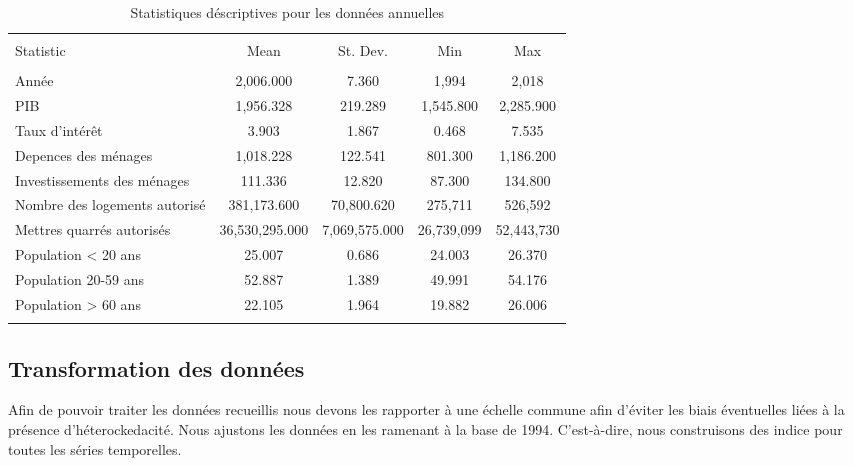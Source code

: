 \documentclass[11pt,]{article}
\begin{document}
\FloatBarrier

\begin{table}[!htbp] \centering 
\begin{tabular}{@{\extracolsep{5pt}}lcccc} 
\\[-1.8ex]\hline 
\hline \\[-1.8ex] 
Statistic & \multicolumn{1}{c}{Mean} & \multicolumn{1}{c}{St. Dev.} & \multicolumn{1}{c}{Min} & \multicolumn{1}{c}{Max} \\ 
\hline \\[-1.8ex] 
Année & 2,006.000 & 7.360 & 1,994 & 2,018 \\ 
PIB & 1,956.328 & 219.289 & 1,545.800 & 2,285.900 \\ 
Taux d'intérêt & 3.903 & 1.867 & 0.468 & 7.535 \\ 
Depences des ménages & 1,018.228 & 122.541 & 801.300 & 1,186.200 \\ 
Investissements des ménages & 111.336 & 12.820 & 87.300 & 134.800 \\ 
Nombre des logements autorisé & 381,173.600 & 70,800.620 & 275,711 & 526,592 \\ 
Mettres quarrés autorisés & 36,530,295.000 & 7,069,575.000 & 26,739,099 & 52,443,730 \\ 
Population < 20 ans & 25.007 & 0.686 & 24.003 & 26.370 \\ 
Population 20-59 ans & 52.887 & 1.389 & 49.991 & 54.176 \\ 
Population > 60 ans & 22.105 & 1.964 & 19.882 & 26.006 \\ 
\hline \\[-1.8ex] 
\end{tabular} 
  \caption{Statistiques déscriptives pour les données annuelles} 
  \label{} 
\end{table}

\FloatBarrier

\hypertarget{transformation-des-donnees}{%
\subsection{Transformation des
données}\label{transformation-des-donnees}}

Afin de pouvoir traiter les données recueillis nous devons les rapporter
à une échelle commune afin d'éviter les biais éventuelles liées à la
présence d'héterockedacité. Nous ajustons les données en les ramenant à
la base de 1994. C'est-à-dire, nous construisons des indice pour toutes
les séries temporelles.
\end{document}
